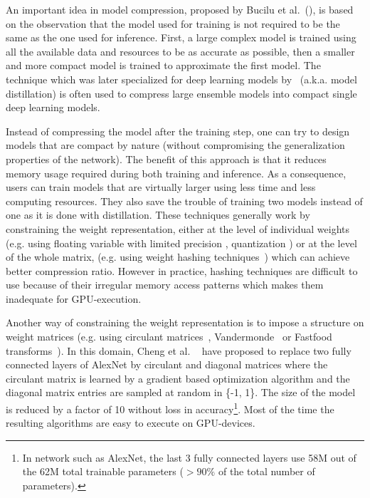 \documentclass[runningheads]{llncs}
\begin{document}
An important idea in model compression, proposed by Bucilu et al.~(\cite{bucilua2006model}), is based on the observation that the model used for training is not required to be the same as the one used for inference. First, a large complex model is trained using all the available data and resources  to be as accurate as possible, then a smaller and more compact model is trained to approximate the first model. The technique which was later specialized for deep learning models by~\cite{44873} (a.k.a. model distillation) is often used to compress large ensemble models into compact single deep learning models.

Instead of compressing the model after the training step, one can try to design models that are compact by nature (without compromising the generalization properties of the network). The benefit of this approach is that it reduces  memory usage required during both training and inference. As a consequence, users can train models that are virtually larger using less time and less computing resources. They also save the trouble of training two models instead of one as it is done with distillation. These techniques generally work by constraining the weight representation, either at the level of individual weights (e.g. using floating variable with limited precision \cite{Gupta:2015:DLL:3045118.3045303}, quantization \cite{Courbariaux:2015:BTD:2969442.2969588,DBLP:journals/corr/MellempudiKM0KD17,rastegariECCV16}) or  at the level of the whole matrix, (e.g. using weight hashing techniques~\cite{Chen:2015:CNN:3045118.3045361}) which can achieve better compression ratio. However in practice, hashing techniques are difficult to use because of their irregular memory access patterns which makes them inadequate for GPU-execution.

Another way of constraining the weight representation is to impose a structure on weight matrices (e.g. using circulant matrices~\cite{7410684,NIPS2015_5869}, Vandermonde~\cite{NIPS2015_5869} or Fastfood transforms~\cite{7410530}). In this domain, Cheng et al. ~\cite{7410684} have proposed to replace two fully connected layers of AlexNet by circulant and diagonal matrices where the circulant matrix is learned by a gradient based optimization algorithm and the diagonal matrix entries are sampled at random in \{-1, 1\}. The size of the model is reduced by a factor of 10 without loss in accuracy\footnote{In network such as AlexNet, the last 3 fully connected layers use 58M out of the 62M total trainable parameters ($> 90\%$ of the total number of parameters).}. Most of the time the resulting algorithms are easy to execute on GPU-devices.
\end{document}
